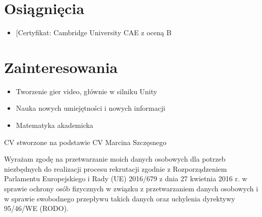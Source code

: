 \documentclass{article}
\begin{document}
\section*{Osiągnięcia}
\begin{itemize}
  \item {[Certyfikat: Cambridge University CAE z oceną B}
\end{itemize}

\section*{Zainteresowania}
\begin{itemize}
    \item {Tworzenie gier video, głównie w silniku Unity}
    \item {Nauka nowych umiejętności i nowych informacji}
    \item {Matematyka akademicka}
\end{itemize}

\vfill
{\footnotesize
CV stworzone na podstawie CV Marcina Szczęsnego

Wyrażam zgodę na przetwarzanie moich danych osobowych dla potrzeb niezbędnych do
realizacji procesu rekrutacji zgodnie z Rozporządzeniem Parlamentu Europejskiego
i Rady (UE) 2016/679 z dnia 27 kwietnia 2016 r. w sprawie ochrony osób fizycznych
w związku z przetwarzaniem danych osobowych i w sprawie swobodnego przepływu takich
danych oraz uchylenia dyrektywy 95/46/WE (RODO).\par}
\end{document}
